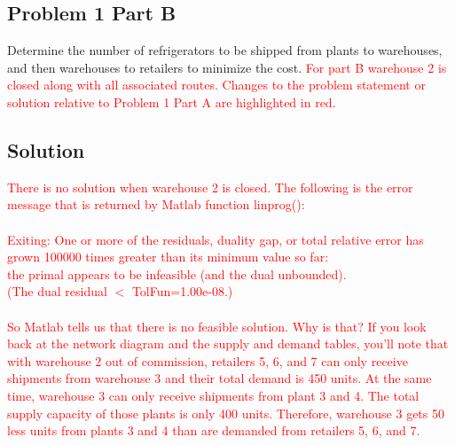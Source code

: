 \documentclass[../report/main.tex]{subfiles}
\begin{document}
\subsection*{Problem 1 Part B}
Determine the number of refrigerators to be shipped from plants to warehouses, and then warehouses to retailers to minimize the cost.  \textcolor{red}{For part B warehouse 2 is closed along with all associated routes.  Changes to the problem statement or solution relative to Problem 1 Part A are highlighted in red.}

\subsection*{Solution}
\textcolor{red}{There is no solution when warehouse 2 is closed.  The following is the error message that is returned by Matlab function linprog():\\\\Exiting: One or more of the residuals, duality gap, or total relative error has grown 100000 times greater than its minimum value so far:\\\indent the primal appears to be infeasible (and the dual unbounded).\\ \indent(The dual residual $<$ TolFun=1.00e-08.)\\\\So Matlab tells us that there is no feasible solution.  Why is that?  If you look back at the network diagram and the supply and demand tables, you'll note that with warehouse 2 out of commission, retailers 5, 6, and 7 can only receive shipments from warehouse 3 and their total demand is 450 units.  At the same time, warehouse 3 can only receive shipments from plant 3 and 4.  The total supply capacity of those plants is only 400 units.  Therefore, warehouse 3 gets 50 less units from plants 3 and 4 than are demanded from retailers 5, 6, and 7.}
\end{document}
